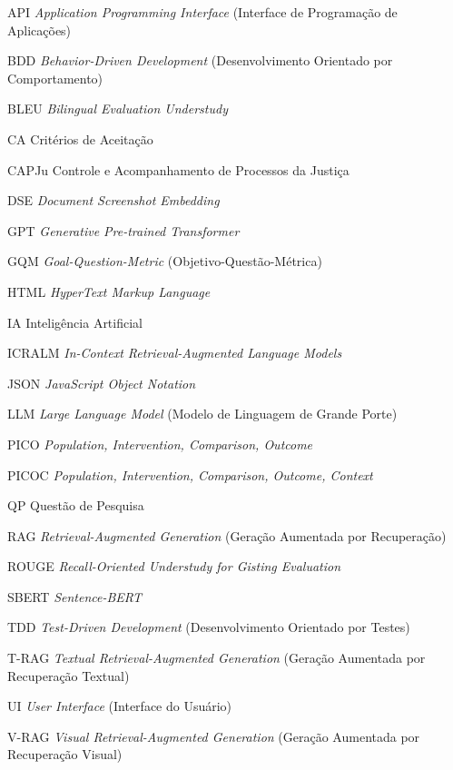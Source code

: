 \begin{siglas}
  \item[API] \textit{Application Programming Interface} (Interface de Programação de Aplicações)
  \item[BDD] \textit{Behavior-Driven Development} (Desenvolvimento Orientado por Comportamento)
  \item[BLEU] \textit{Bilingual Evaluation Understudy}
  \item[CA] Critérios de Aceitação
  \item[CAPJu] Controle e Acompanhamento de Processos da Justiça
  \item[DSE] \textit{Document Screenshot Embedding}
  \item[GPT] \textit{Generative Pre-trained Transformer}
  \item[GQM] \textit{Goal-Question-Metric} (Objetivo-Questão-Métrica)
  \item[HTML] \textit{HyperText Markup Language}
  \item[IA] Inteligência Artificial
  \item[ICRALM] \textit{In-Context Retrieval-Augmented Language Models}
  \item[JSON] \textit{JavaScript Object Notation}
  \item[LLM] \textit{Large Language Model} (Modelo de Linguagem de Grande Porte)
  \item[PICO] \textit{Population, Intervention, Comparison, Outcome}
  \item[PICOC] \textit{Population, Intervention, Comparison, Outcome, Context}
  \item[QP] Questão de Pesquisa
  \item[RAG] \textit{Retrieval-Augmented Generation} (Geração Aumentada por Recuperação)
  \item[ROUGE] \textit{Recall-Oriented Understudy for Gisting Evaluation}
  \item[SBERT] \textit{Sentence-BERT}
  \item[TDD] \textit{Test-Driven Development} (Desenvolvimento Orientado por Testes)
  \item[T-RAG] \textit{Textual Retrieval-Augmented Generation} (Geração Aumentada por Recuperação Textual)
  \item[UI] \textit{User Interface} (Interface do Usuário)
  \item[V-RAG] \textit{Visual Retrieval-Augmented Generation} (Geração Aumentada por Recuperação Visual)
\end{siglas}
